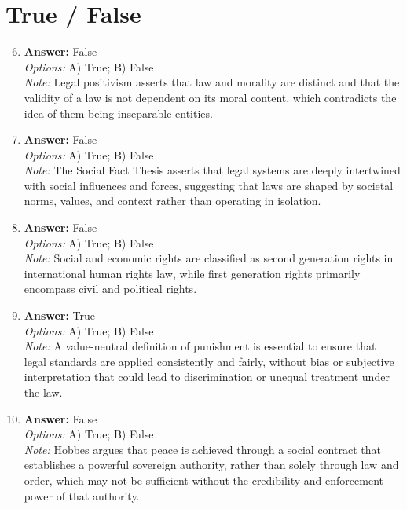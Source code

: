 \documentclass[12pt]{article}
\begin{document}
\section*{True / False}
\begin{enumerate}[label=\arabic*.]
\setcounter{enumi}{5}
\item \textbf{Answer:} False
\\ \textit{Options:} A) True; B) False
\\ \textit{Note:} Legal positivism asserts that law and morality are distinct and that the validity of a law is not dependent on its moral content, which contradicts the idea of them being inseparable entities.
\item \textbf{Answer:} False
\\ \textit{Options:} A) True; B) False
\\ \textit{Note:} The Social Fact Thesis asserts that legal systems are deeply intertwined with social influences and forces, suggesting that laws are shaped by societal norms, values, and context rather than operating in isolation.
\item \textbf{Answer:} False
\\ \textit{Options:} A) True; B) False
\\ \textit{Note:} Social and economic rights are classified as second generation rights in international human rights law, while first generation rights primarily encompass civil and political rights.
\item \textbf{Answer:} True
\\ \textit{Options:} A) True; B) False
\\ \textit{Note:} A value-neutral definition of punishment is essential to ensure that legal standards are applied consistently and fairly, without bias or subjective interpretation that could lead to discrimination or unequal treatment under the law.
\item \textbf{Answer:} False
\\ \textit{Options:} A) True; B) False
\\ \textit{Note:} Hobbes argues that peace is achieved through a social contract that establishes a powerful sovereign authority, rather than solely through law and order, which may not be sufficient without the credibility and enforcement power of that authority.
\end{enumerate}
\end{document}
